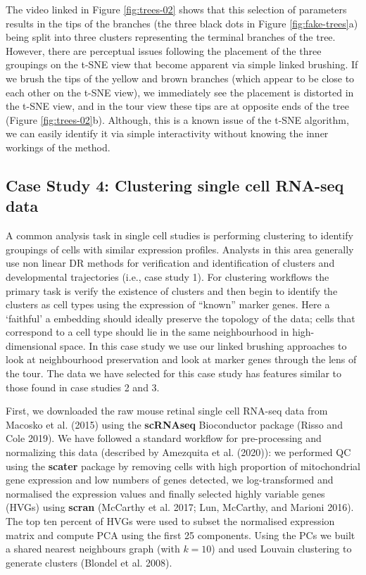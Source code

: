 \documentclass[article,notitle]{jdssv}
\begin{document}
The video linked in Figure \ref{fig:trees-02} shows that this selection of
parameters results in the
tips of the branches (the three black dots in Figure \ref{fig:fake-trees}a)
being split into three clusters representing the terminal branches of the tree.
However, there are perceptual issues following the placement of the three
groupings on the t-SNE view that become apparent via simple linked brushing.
If we brush the
tips of the yellow and brown branches (which appear to be close to each other
on the t-SNE view), we immediately see the placement is distorted in the t-SNE
view, and in the tour view these tips are at opposite ends of the tree
(Figure \ref{fig:trees-02}b).
Although, this is a known issue of the t-SNE algorithm, we can easily identify
it via simple interactivity without knowing the inner workings of the method.

\hypertarget{case-study-4-clustering-single-cell-rna-seq-data}{%
\subsection{Case Study 4: Clustering single cell RNA-seq data}\label{case-study-4-clustering-single-cell-rna-seq-data}}

A common analysis task in single cell studies is performing clustering to
identify groupings of cells with similar expression profiles. Analysts
in this area generally use non linear DR methods for verification and identification
of clusters and developmental trajectories (i.e., case study 1). For clustering
workflows the primary task is verify the existence of clusters and then begin to
identify the clusters as cell types using the expression of ``known''
marker genes. Here a `faithful' a embedding should ideally preserve the topology
of the data; cells that correspond to a cell type should lie in the same
neighbourhood in high-dimensional space. In this case study we use our
linked brushing approaches to look at neighbourhood preservation
and look at marker genes through the lens of the tour. The data we have
selected for this case study has features similar to those found in case studies
2 and 3.

First, we downloaded the raw mouse retinal single cell RNA-seq data from
Macosko et al. (2015) using the \textbf{scRNAseq} Bioconductor package (Risso and Cole 2019). We
have followed a standard workflow for pre-processing and normalizing this data
(described by Amezquita et al. (2020)): we performed QC using the \textbf{scater} package
by removing cells with high proportion of mitochondrial gene expression and low
numbers of genes detected, we log-transformed and normalised the expression
values and finally selected highly variable genes (HVGs) using \textbf{scran}
(McCarthy et al. 2017; Lun, McCarthy, and Marioni 2016). The top ten percent of HVGs were used to subset
the normalised expression matrix and compute PCA using the first 25 components.
Using the PCs we built a shared nearest neighbours graph (with \(k = 10\)) and
used Louvain clustering to generate clusters (Blondel et al. 2008).
\end{document}
